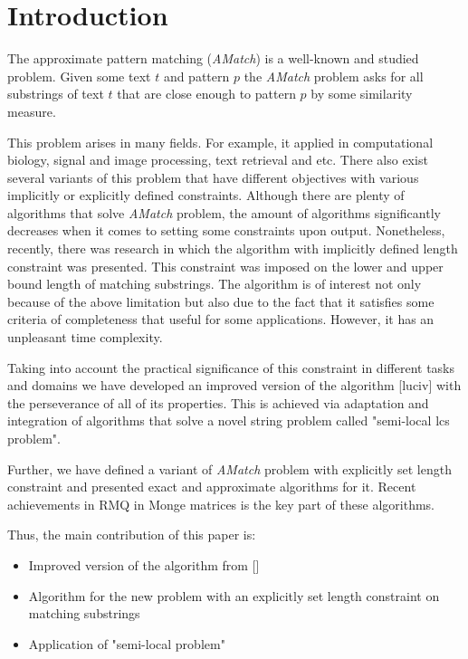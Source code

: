 \section{Introduction}

The approximate pattern matching (\emph{AMatch}) is a well-known and studied problem.
Given some text $t$ and pattern  $p$ the \emph{AMatch} problem asks for all substrings of text $t$ that are close enough to pattern $p$ by some similarity measure.

This problem arises in many fields.
For example,  it applied in computational biology, signal and image processing, text retrieval and etc.
There also exist several variants of this problem that have different objectives with various implicitly or explicitly defined constraints.
Although there are plenty of algorithms that solve \emph{AMatch} problem, the amount of algorithms significantly decreases when it comes to setting some constraints upon output. Nonetheless, recently, there was research in which the algorithm with implicitly defined length constraint was presented.
This constraint was imposed on the lower and upper bound length of matching substrings.
The algorithm is of interest not only because of the above limitation but also due to the fact that it satisfies some criteria of completeness that useful for some applications.
However, it has an unpleasant time complexity.

Taking into account the practical significance of this constraint in different tasks and domains we have developed an improved version of the algorithm [luciv] with the perseverance of all of its properties.
This is achieved via adaptation and integration of algorithms that solve a novel string problem called "semi-local lcs problem".

Further, we have defined a variant of \emph{AMatch} problem with explicitly set length constraint and presented exact and approximate algorithms for it.
Recent achievements in RMQ in Monge matrices is the key part of these algorithms.

Thus, the main contribution of this paper is:
\begin{itemize}
    \item Improved version of the algorithm from []
    \item Algorithm for the new problem with an explicitly set length constraint on matching substrings 
    \item Application of  "semi-local problem"
\end{itemize}

